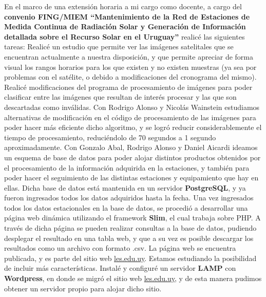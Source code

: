 \documentclass[11pt,a4paper]{moderncv}
\begin{document}
        {En el marco de una extensión horaria a mi cargo como docente, a cargo del \textbf{convenio FING/MIEM ``Mantenimiento de la Red de Estaciones de Medida Continua de Radiación Solar y Generación de Información detallada sobre el Recurso Solar en el Uruguay''} realicé las siguientes tareas:
        \newline{}
        Realicé un estudio que permite ver las imágenes satelitales que se encuentran actualmente a nuestra disposición, y que permite apreciar de forma visual los rangos horarios para los que existen y no existen muestras (ya sea por problemas con el satélite, o debido a modificaciones del cronograma del mismo).
        \newline{}
        Realicé modificaciones del programa de procesamiento de imágenes para poder clasificar entre las imágenes que resultan de interés procesar y las que son descartadas como inválidas. Con Rodrigo Alonso y Nicolás Wainstein estudiamos alternativas de modificación en el código de procesamiento de las imágenes para poder hacer más eficiente dicho algoritmo, y se logró reducir considerablemente el tiempo de procesamiento, reduciéndolo de 70 segundos a 1 segundo aproximadamente.
        \newline{}
        Con Gonzalo Abal, Rodrigo Alonso y Daniel Aicardi ideamos un esquema de base de datos para poder alojar distintos productos obtenidos por el procesamiento de la información adquirida en la estaciones, y también para poder hacer el seguimiento de las distintas estaciones y equipamiento que hay en ellas. Dicha base de datos está mantenida en un servidor \textbf{PostgreSQL}, y ya fueron ingresados todos los datos adquiridos hasta la fecha.
        \newline{}
        Una vez ingresados todos los datos estacionales en la base de datos, se procedió a desarrollar una página web dinámica utilizando el framework \textbf{Slim}, el cual trabaja sobre PHP. A través de dicha página se pueden realizar consultas a la base de datos, pudiendo desplegar el resultado en una tabla web, y que a su vez es posible descargar los resultados como un archivo con formato .csv. La página web se encuentra publicada, y es parte del sitio web \url{les.edu.uy}. Estamos estudiando la posibilidad de incluir más características.
        \newline{}
        Instalé y configuré un servidor \textbf{LAMP} con \textbf{Wordpress}, en donde se migró el sitio web \url{les.edu.uy}, y de esta manera pudimos obtener un servidor propio para alojar dicho sitio.
        }
\end{document}
